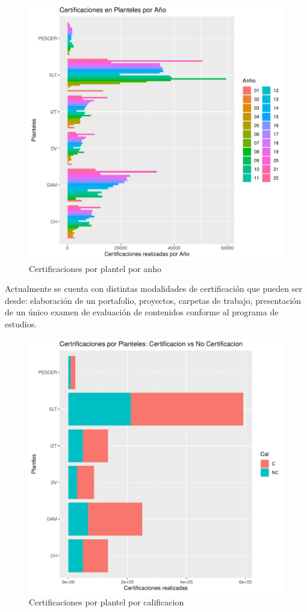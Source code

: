 \documentclass[12pt]{article}
\begin{document}
\begin{figure}
\centering
\includegraphics[scale=0.45]{Graficas/ggplotBarplotPlantelAnho.pdf}
\caption{Certificaciones por plantel por anho}
\label{Fig.Cert.Plantel-Anho}
\end{figure}


Actualmente se cuenta con distintas modalidades de certificaci\'on que pueden ser desde: elaboraci\'on de un portafolio,  proyectos, carpetas de trabajo,  presentaci\'on de un \'unico examen de evaluaci\'on de contenidos conforme al programa de estudios.

\begin{figure}
\centering
\includegraphics[scale=0.45]{Graficas/ggplotBarplotPlantelCal.pdf}
\caption{Certificaciones por plantel por calificacion}
\label{Fig.Cert.Plantel-Cal}
\end{figure}
\end{document}
